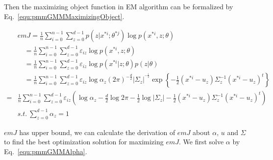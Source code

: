 \documentclass[runningheads,openany]{xhlPaper}
\begin{document}
Then the maximizing object function in EM algorithm can be formalized by Eq.~\ref{equ:pmmGMMMaximizingObject}.

\begin{equation}
\label{equ:pmmGMMMaximizingObject}
\begin{aligned}
&emJ = \frac{1}{n}\sum\limits_{i = 0}^{n - 1} {\sum\limits_{z = 0}^{d - 1} {p\left( {z|{x^{*i}};{\theta ^{*j}}} \right)\log p\left( {{x^{*i}},z;\theta } \right)} } \\
 &\quad= \frac{1}{n}\sum\limits_{i = 0}^{n - 1} {\sum\limits_{z = 0}^{d - 1} {{\varepsilon _{iz}}\log p\left( {{x^{*i}},z;\theta } \right)} } \\
 &\quad= \frac{1}{n}\sum\limits_{i = 0}^{n - 1} {\sum\limits_{z = 0}^{d - 1} {{\varepsilon _{iz}}\log p\left( {{x^{*i}}|z;\theta } \right)p\left( {z|\theta } \right)} } \\
 &\quad= \frac{1}{n}\sum\limits_{i = 0}^{n - 1} {\sum\limits_{z = 0}^{d - 1} {{\varepsilon _{iz}}\log {\alpha _z}{{\left( {2\pi } \right)}^{ - \frac{d}{2}}}|\Sigma_{z} {|^{^{ - \frac{1}{2}}}}\exp \left\{ { - \frac{1}{2}\left( {{x^{*i}} - {u_z}} \right){\Sigma_{z} ^{ - 1}}{{\left( {{x^{*i}} - {u_z}} \right)}^t}} \right\}} } \\
 =& \frac{1}{n}\sum\limits_{i = 0}^{n - 1} {\sum\limits_{z = 0}^{d - 1} {{\varepsilon _{iz}}
 \left( {\log {\alpha _z} - \frac{d}{2}\log 2\pi  - \frac{1}{2}\log |\Sigma_{z} | - \frac{1}{2}\left( {{x^{*i}} - {u_z}} \right){\Sigma_{z} ^{ - 1}}{{\left( {{x^{*i}} - {u_z}} \right)}^t}} \right)}}\\
&s.t.\ \sum\limits_{z = 0}^{d - 1} {{\alpha _z}}  = 1
\end{aligned}
\end{equation}

$emJ$ has upper bound, we can calculate the derivation of $emJ$ about $\alpha$, $u$ and $\Sigma$ to find the best optimization solution for maximizing $emJ$. We first solve $\alpha$ by Eq.~\ref{equ:pmmGMMAlpha}.
\end{document}

